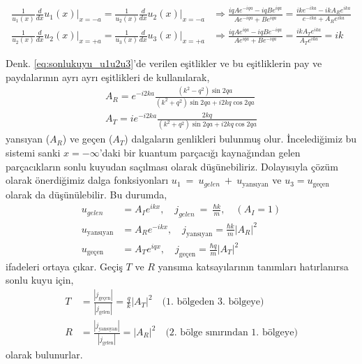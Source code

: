 \documentclass[a4paper,12pt, twoside]{article}
\begin{document}
\begin{align}
\frac{1}{u_1(x)} \frac{d}{d x}u_1(x)\bigg|_{x=-a} = \frac{1}{u_2(x)} \frac{d}{d x}u_2(x)\bigg|_{x=-a}  &\Longrightarrow \frac{i q A e^{-i q a}-i q B e^{i q a}}{A e^{-i q a}+B e^{i q a}}=\frac{i k e^{-i k a}-i k A_R e^{i k a}}{e^{-i k a}+ A_R e^{i k a}} \nonumber\\
\frac{1}{u_2(x)} \frac{d}{d x}u_2(x)\bigg|_{x=+a} = \frac{1}{u_3(x)} \frac{d}{d x}u_3(x)\bigg|_{x=+a} &\Longrightarrow \frac{i q A e^{i q a}-i q B e^{-i q a}}{A e^{i q a}+B e^{-i q a}}=\frac{i k A_T e^{i k a}}{A_T e^{i k a}}=i k
\label{eq:sonlukuyu_u1u2u3}
\end{align}

Denk. \ref{eq:sonlukuyu_u1u2u3}'de verilen eşitlikler ve bu eşitliklerin pay ve paydalarının ayrı ayrı eşitlikleri de kullanılarak,
\begin{align}
{A_R= e^{-i 2 k a} \frac{\left(k^{2}-q^{2}\right) \sin 2 q a}{\left(k^{2}+q^{2}\right) \sin 2 q a + i 2 k q \cos 2 q a}} \\ 
{A_T= i e^{-i 2 k a} \frac{2 k q}{\left(k^{2}+q^{2}\right) \sin 2 q a + i 2 k q \cos 2 q a}}
\end{align}
yansıyan ($A_R$) ve geçen ($A_T$) dalgaların genlikleri bulunmuş olur. İncelediğimiz bu sistemi sanki $x = -\infty$'daki bir kuantum parçacığı kaynağından gelen parçacıkların sonlu kuyudan saçılması olarak düşünebiliriz. Dolayısıyla çözüm olarak önerdiğimiz dalga fonksiyonları $u_1~=~u_{gelen}~+~u_\text{yansıyan}$ ve $u_3 = u_\text{geçen}$ olarak da düşünülebilir. Bu durumda,
\begin{align}
u_{gelen} &= A_I e^{i k x}, \quad j_{gelen}~=~\frac{\hbar k} {m}, \quad (A_I = 1)\\
u_\text{yansıyan} &= A_R e^{-i k x}, \quad j_\text{yansıyan} = \frac{\hbar k} {m} |A_R|^2\\
u_\text{geçen} &= A_T e^{i q x}, \quad j_\text{geçen} = \frac{\hbar q} {m} |A_T|^2
\end{align}
ifadeleri ortaya çıkar. Geçiş $T$ ve $R$ yansıma katsayılarının tanımları hatırlanırsa sonlu kuyu için,
\begin{align}
T &= \frac{|j_\text{geçen}|}{|j_\text{gelen}|} = \frac{q}{k}  |A_T|^2  \quad \text{(1. bölgeden 3. bölgeye)}\\
R &= \frac{|j_\text{yansıyan}|}{|j_\text{gelen}|} = |A_R|^2 \quad \text{(2. bölge sınırından 1. bölgeye)}
\end{align}
olarak bulunurlar.

\newpage
\renewcommand\refname{Kaynaklar}
{}
 
\end{document}
